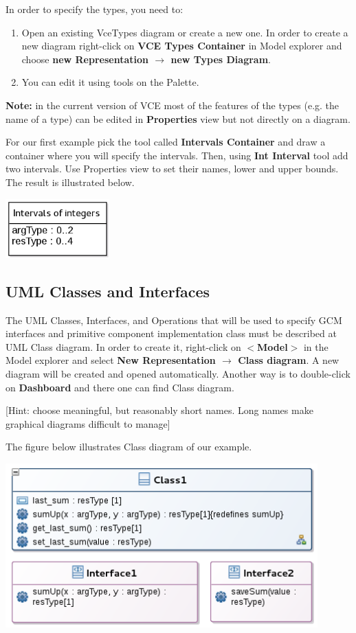 \documentclass[12pt]{article}
\begin{document}
In order to specify the types, you need to:

\begin{enumerate}
\item
Open an existing VceTypes diagram or create a new one. In order to create a new diagram right-click on \textbf{VCE Types Container} in Model explorer and choose \textbf{new Representation $\rightarrow$ new Types Diagram}.
\item
You can edit it using tools on the Palette. 
\end{enumerate}

\textbf{Note: }in the current version of VCE most of the features of the types (e.g. the name of a type) can be edited in \textbf{Properties} view but not directly on a diagram.

For our first example pick the tool called \textbf{Intervals Container} and draw a container where you will specify the intervals. Then, using \textbf{Int Interval} tool add two intervals. Use Properties view to set their names, lower and upper bounds. The result is illustrated below.

     \centerline{
     \includegraphics[width=4cm]{draws/types.png}
     \label{fig:vce-proj}
     }

\subsection{UML Classes and Interfaces}\label{sec:uml-classes}
The UML Classes, Interfaces, and Operations that will be used to specify GCM interfaces and primitive component implementation class must be described at UML Class diagram. In order to create it, right-click on \textbf{$<$Model$>$} in the Model explorer and select \textbf{New Representation $\rightarrow$ Class diagram}. A new diagram will be created and opened automatically. Another way is to double-click on \textbf{Dashboard} and there one can find Class diagram. 

[Hint: choose meaningful, but reasonably short names. Long names make graphical diagrams difficult to manage]

The figure below illustrates Class diagram of our example. 

     \centerline{
     \includegraphics[width=12cm]{draws/classes.png}
     \label{fig:vce-proj}
     }
\end{document}
